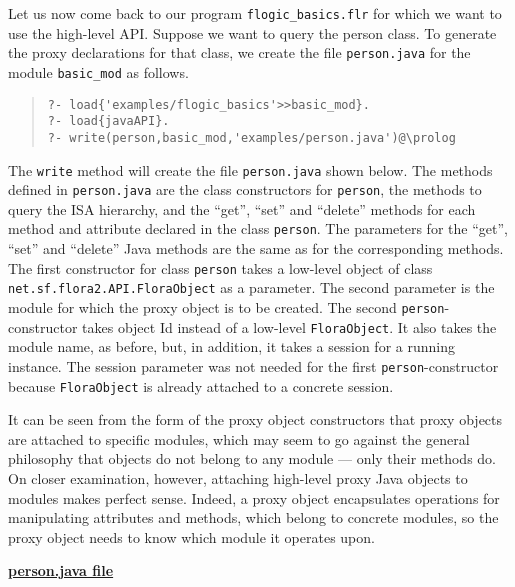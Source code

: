 Let us now come back to our program {\tt flogic\_basics.flr} for which we
want to use the high-level API.  Suppose we want to query the person class.
To generate the proxy declarations for that class, we create
the file {\tt person.java} for the 
module {\tt basic\_mod} as follows.
\begin{quote}
\begin{verbatim}
?- load{'examples/flogic_basics'>>basic_mod}.
?- load{javaAPI}.
?- write(person,basic_mod,'examples/person.java')@\prolog
\end{verbatim}
\end{quote}


The {\tt write} method will create the file {\tt person.java} shown
below.  The methods defined in {\tt person.java} are the class constructors
for {\tt person}, the methods to query the ISA hierarchy, and the ``get'',
``set'' and ``delete'' methods for each method and attribute declared in
the \FLSYSTEM class {\tt person}.  The parameters for the ``get'', ``set'' and
``delete'' Java methods are the same as for the corresponding \FLSYSTEM
methods. The first constructor for class {\tt person} takes a low-level
object of class {\tt net.sf.flora2.API.FloraObject} as a
parameter. The second parameter is the \FLSYSTEM module for which the proxy
object is to be created.
The second {\tt person}-constructor takes \fl object Id instead of a
low-level {\tt FloraObject}. It also takes the module name, as before, but,
in addition, it takes a session for a running \FLSYSTEM instance.
The session parameter was not needed for the first {\tt person}-constructor
because {\tt FloraObject} is already attached to a concrete session.  

It can be seen from the form of the proxy object constructors that
proxy objects are attached to specific \FLSYSTEM modules, which may seem to
go against the general philosophy that \fl objects do not belong to any
module --- only their methods do. On closer examination, however, attaching
high-level proxy Java objects to modules makes perfect sense. Indeed, a
proxy object encapsulates operations for manipulating \fl attributes 
and methods, which belong to concrete \FLSYSTEM modules, so the proxy object
needs to know which module it operates upon.


\underline{{\bf person.java file}}

